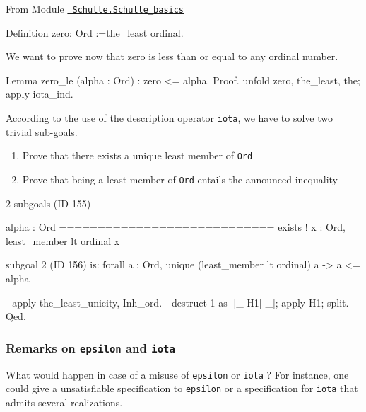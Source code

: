 \vspace{4pt}

From Module \href{../theories/html/hydras.Schutte.Schutte_basics.html}%
{\texttt{~Schutte.Schutte\_basics}}

\label{Constants:zero:Ord}

\begin{Coqsrc}
Definition zero: Ord :=the_least ordinal.
\end{Coqsrc}

We want to prove now that zero is less than or equal to any ordinal number.

\begin{Coqsrc}
Lemma zero_le (alpha : Ord) :  zero <= alpha.
Proof.
  unfold zero, the_least, the; apply iota_ind.
\end{Coqsrc}

According to the use of the description operator \texttt{iota}, we have to solve  two trivial sub-goals.
\begin{enumerate}
\item Prove that there exists a unique least member of \texttt{Ord}
\item Prove that being a least member of \texttt{Ord} entails the announced inequality 
\end{enumerate}


\begin{Coqanswer}
2 subgoals (ID 155)
  
  alpha : Ord
  ============================
  exists ! x : Ord, least_member lt ordinal x

subgoal 2 (ID 156) is:
 forall a : Ord, unique (least_member lt ordinal) a -> 
                a <= alpha
\end{Coqanswer}

\begin{Coqsrc}
  -  apply the_least_unicity, Inh_ord.
  -  destruct 1 as [[_ H1] _]; apply H1; split. 
Qed.
\end{Coqsrc}

\subsubsection{Remarks on \texttt{epsilon} and \texttt{iota}}

 What would happen in case of a misuse of \texttt{epsilon} or \texttt{iota} ?
For instance, one could give a unsatisfiable specification to \texttt{epsilon} or 
a specification for \texttt{iota} that admits several realizations.

